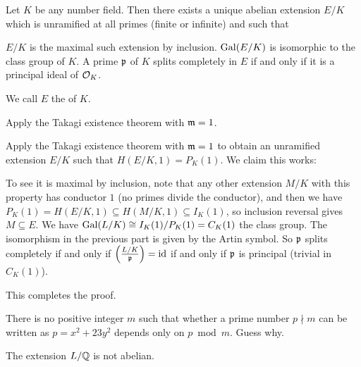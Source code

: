 \begin{dproblem}
	\label{prob:hilbert_class_field}
	Let $K$ be any number field.
	Then there exists a unique abelian extension $E/K$
	which is unramified at all primes (finite or infinite)
	and such that
	\begin{itemize}
		\ii $E/K$ is the maximal such extension by inclusion.
		\ii $\operatorname{Gal}(E/K)$ is isomorphic to the class group of $K$.
		\ii A prime $\mathfrak p$ of $K$ splits completely in $E$
		if and only if it is a principal ideal of $\mathcal O_K$.
	\end{itemize}
	We call $E$ the  of $K$.
	\begin{hint}
		Apply the Takagi existence theorem with $\mathfrak m = 1$.
	\end{hint}
	\begin{sol}
		Apply the Takagi existence theorem with $\mathfrak m = 1$
		to obtain an unramified extension $E/K$ such that
		$H(E/K, 1) = P_K(1)$.
		We claim this works:
		\begin{itemize}
			\ii To see it is maximal by inclusion, note that any other extension $M/K$
			with this property has conductor $1$ (no primes divide the conductor),
			and then we have $P_K(1) = H(E/K, 1) \subseteq H(M/K, 1) \subseteq I_K(1)$,
			so inclusion reversal gives $M \subseteq E$.
			\ii We have $\operatorname{Gal}(L/K) \cong I_K(1) / P_K(1) = C_K(1)$ the class group.
			\ii The isomorphism in the previous part is given by the Artin symbol.
			So $\mathfrak p$ splits completely if and only if $\left( \frac{L/K}{\mathfrak p} \right) = \mathrm{id}$
			if and only if $\mathfrak p$ is principal (trivial in $C_K(1)$).
		\end{itemize}
		This completes the proof.
	\end{sol}
\end{dproblem}

\begin{problem}
	There is no positive integer $m$ such that whether a prime number $p \nmid m$ can be written as
	$p = x^2 + 23 y^2$ depends only on $p \bmod m$. Guess why.
	\begin{hint}
		The extension $L/\mathbb Q$ is not abelian.
	\end{hint}
\end{problem}

